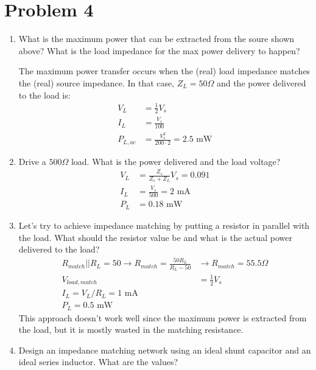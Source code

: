 \section*{Problem 4}

\begin{enumerate}[label=(\alph*)]
    \item What is the maximum power that can be extracted from the soure shown above? What is the load impedance for the max power delivery to happen?

    The maximum power transfer occurs when the (real) load impedance matches the (real) source impedance. In that case, $Z_L = 50 \Omega$ and the power delivered to the load is:
    \begin{align*}
        V_L &= \frac{1}{2} V_s \\
        I_L &= \frac{V_s}{100} \\
        P_{L,ac} &= \frac{V_s^2}{200 \cdot 2} = 2.5 \text{ mW}
    \end{align*}

    \item Drive a $500\Omega$ load. What is the power delivered and the load voltage?
    \begin{align*}
        V_L &= \frac{Z_s}{Z_s + Z_L} V_s = 0.091 \\
        I_L &= \frac{V_s}{500} = 2 \text{ mA} \\
        P_L &= 0.18 \text{ mW}
    \end{align*}

    \item Let's try to achieve impedance matching by putting a resistor in parallel with the load. What should the resistor value be and what is the actual power delivered to the load?
    \begin{align*}
        R_{match} || R_L = 50 \rightarrow R_{match} = \frac{50 R_L}{R_L - 50} &\rightarrow R_{match} = 55.5 \Omega \\
        V_{load,match} &= \frac{1}{2} V_s \\
        I_L = V_L/R_L = 1 \text{ mA} \\
        P_L = 0.5 \text{ mW}
    \end{align*}
    This approach doesn't work well since the maximum power is extracted from the load, but it is mostly wasted in the matching resistance.

    \item Design an impedance matching network using an ideal shunt capacitor and an ideal series inductor. What are the values?


\end{enumerate}
